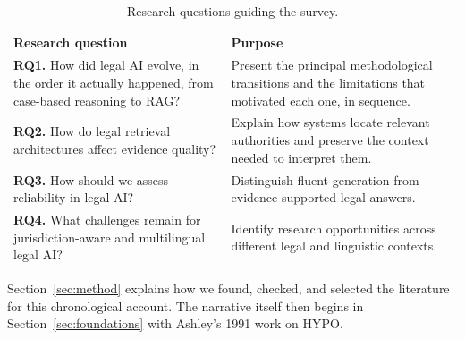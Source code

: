 \begin{table}[t]
\centering
\caption{Research questions guiding the survey.}
\label{tab:rq}
\footnotesize
\setlength{\tabcolsep}{5pt}
\renewcommand{\arraystretch}{1.25}
\begin{tabularx}{\textwidth}{>{\raggedright\arraybackslash}X >{\raggedright\arraybackslash}X}
\toprule
\textbf{Research question} & \textbf{Purpose} \\
\midrule
\textbf{RQ1.} How did legal AI evolve, in the order it actually happened, from case-based reasoning to RAG? & Present the principal methodological transitions and the limitations that motivated each one, in sequence. \\
\textbf{RQ2.} How do legal retrieval architectures affect evidence quality? & Explain how systems locate relevant authorities and preserve the context needed to interpret them. \\
\textbf{RQ3.} How should we assess reliability in legal AI? & Distinguish fluent generation from evidence-supported legal answers. \\
\textbf{RQ4.} What challenges remain for jurisdiction-aware and multilingual legal AI? & Identify research opportunities across different legal and linguistic contexts. \\
\bottomrule
\end{tabularx}
\end{table}

Section~\ref{sec:method} explains how we found, checked, and selected the literature for this
chronological account. The narrative itself then begins in Section~\ref{sec:foundations} with
Ashley's 1991 work on HYPO.
